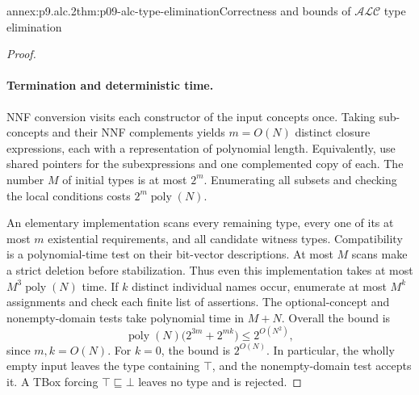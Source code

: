 \begin{annexitem}{annex:p9.alc.2}{thm:p09-alc-type-elimination}{Correctness and bounds of \(\mathcal{ALC}\) type elimination}
\begin{proof}
\paragraph{Termination and deterministic time.}
NNF conversion visits each constructor of the input concepts once.
Taking sub-concepts and their NNF complements yields \(m=O(N)\)
distinct closure expressions, each with a representation of
polynomial length.  Equivalently, use shared pointers for the
subexpressions and one complemented copy of each.
The number \(M\) of initial types is at most \(2^m\).
Enumerating all subsets and checking the local conditions costs
\(2^m\operatorname{poly}(N)\).

An elementary implementation scans every remaining type, every one
of its at most \(m\) existential requirements, and all candidate
witness types.  Compatibility is a polynomial-time test on their
bit-vector descriptions.
At most \(M\) scans make a strict deletion before stabilization.
Thus even this implementation takes at most
\(M^3\operatorname{poly}(N)\) time.
If \(k\) distinct individual names occur, enumerate at most \(M^k\)
assignments and check each finite list of assertions.
The optional-concept and nonempty-domain tests take polynomial
time in \(M+N\).
Overall the bound is
\[
 \operatorname{poly}(N)\bigl(2^{3m}+2^{mk}\bigr)
       \leq 2^{O(N^2)},
\]
since \(m,k=O(N)\).
For \(k=0\), the bound is \(2^{O(N)}\).
In particular, the wholly empty input leaves the type containing
\(\top\), and the nonempty-domain test accepts it.
A TBox forcing \(\top\sqsubseteq\bot\) leaves no type and is rejected.
\end{proof}
\end{annexitem}

